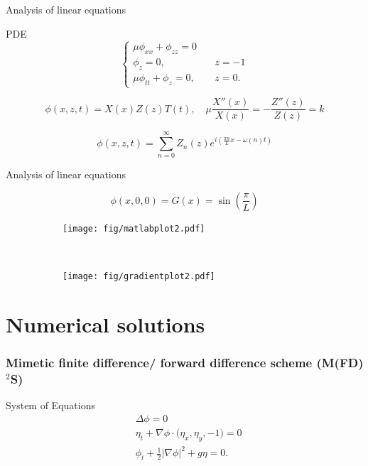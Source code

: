 \documentclass[screen]{beamer}
\begin{document}
\begin{frame}{Analysis of linear equations}
	\begin{block}{PDE}
	\begin{equation*}
		\begin{cases}
				\mu \phi _{xx} + \phi_{zz} = 0&\\
		\phi _z = 0	, &	 				\quad	z = -1	\\
			\mu \phi_{tt} + \phi_z = 0	, & \quad z = 0.
		\end{cases}
	\end{equation*}
	\end{block}
	\pause
	\begin{equation*}
		\phi(x,z,t) = X(x)Z(z)T(t),\quad 		\mu\frac{X''(x)}{X(x)} = - \frac{Z''(z)}{Z(z)} = k
	\end{equation*}

	\begin{equation*}
		\phi(x,z,t) = \sum_{n=0}^{\infty}  Z_n(z)e^{i\left(\frac{\pi n}{L}x - \omega (n) t \right)}
	\end{equation*}
 \end{frame}

\begin{frame}{Analysis of linear equations}
	
	\begin{equation*}
		\phi(x,0,0) = G(x) = \sin \left( \frac{\pi}{L} \right)
	\end{equation*}
	
	\begin{figure}
		\centering
		\begin{subfigure}[b]{0.48\textwidth}
			\texttt{[image: fig/matlabplot2.pdf]}
		\end{subfigure}
		~
		\begin{subfigure}[b]{0.48\textwidth}
			\texttt{[image: fig/gradientplot2.pdf]}
		\end{subfigure}
	\end{figure}
\end{frame}



\section*{Numerical solutions}

\begin{frame}
    \frametitle{Mimetic finite difference/ forward difference scheme (M(FD)$^2$S)}
    \begin{block}{System of Equations}
    \begin{align*}
        & \Delta \phi = 0 \\
        & \eta_t + \nabla\phi\cdot \big(\eta_x, \eta_y, - 1\big) = 0 \\
        & \phi_t + \frac{1}{2}|\nabla \phi |^2 + g\eta = 0.
    \end{align*}
    \end{block}
\end{frame}
\end{document}
